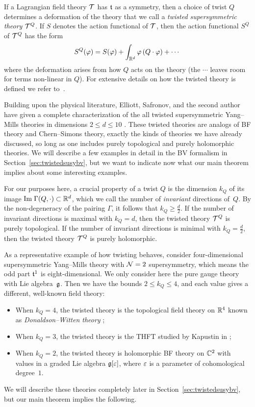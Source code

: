 \documentclass[11pt]{amsart}
\def\owen#1{{\textcolor{green!65!black}{BRW: {#1}}}}
\begin{document}
If a Lagrangian field theory $\mathcal T$ has $\mathfrak t$ as a symmetry, 
then a choice of twist $Q$ determines a deformation of the theory that we call a {\em twisted supersymmetric theory} $\mathcal T^Q$.
If $S$ denotes the action functional of $\mathcal T$, then the action functional $S^Q$ of $\mathcal T^Q$ has the form
\[
S^Q(\varphi) = S(\varphi) + \int_{\mathbb R^d} \varphi  \left(Q \cdot \varphi \right) + \cdots 
\]
where the deformation arises from how $Q$ acts on the theory 
(the $\cdots$ leaves room for terms non-linear in $Q$).
For extensive details on how the twisted theory is defined we refer to~\autocite{CostelloHolomorphic, ESW}. 

Building upon the physical literature, Elliott, Safronov, and the second author have given a complete characterization of the all twisted supersymmetric Yang--Mills theories in dimensions $2 \leq d \leq 10$ \autocite{ESW}. 
These twisted theories are analogs of BF theory and Chern--Simons theory,
exactly the kinds of theories we have already discussed, so long as one includes purely topological and purely holomorphic theories. 
We will describe a few examples in detail in the BV formalism in Section~\ref{sec:twistedsusybv},
but we want to indicate now what our main theorem implies about some interesting examples.

For our purposes here, a crucial property of a twist $Q$ is the dimension $k_Q$ of its image ${\rm Im} \; \Gamma(Q, \cdot) \subset \mathbb R^d$,
which we call the number of {\em invariant} directions of~$Q$.
By the non-degeneracy of the pairing $\Gamma$, it follows that $k_Q \geq \frac{d}{2}$.
If the number of invariant directions is maximal with $k_Q = d$, then the twisted theory $\mathcal T^Q$ is purely topological. 
If the number of invariant directions is minimal with $k_Q = \frac{d}{2}$, then the twisted theory $\mathcal T^Q$ is purely holomorphic. 

As a representative example of how twisting behaves, 
consider four-dimensional supersymmetric Yang--Mills theory with $\mathcal N=2$ supersymmetry,
which means the odd part $\mathfrak t^1$ is eight-dimensional. 
We only consider here the pure gauge theory with Lie algebra~$\mathfrak g$. 
Then we have the bounds $2 \leq k_Q \leq 4$, and each value gives a different, well-known field theory:
\begin{itemize}
\item When $k_Q = 4$, the twisted theory is the topological field theory on $\mathbb R^4$ known as {\it Donaldson--Witten theory} \autocite{WittenTQFT};
\item When $k_Q = 3$, the twisted theory is the THFT studied by Kapustin in \autocite{Kapustin};
\item When $k_Q = 2$, the twisted theory is holomorphic BF theory on $\mathbb C^2$ with values in a graded Lie algebra $\mathfrak g[\varepsilon]$, where $\varepsilon$ is a parameter of cohomological degree~$1$.
\end{itemize}
We will describe these theories completely later in Section~\ref{sec:twistedsusybv},
but our main theorem implies the following.
\end{document}
